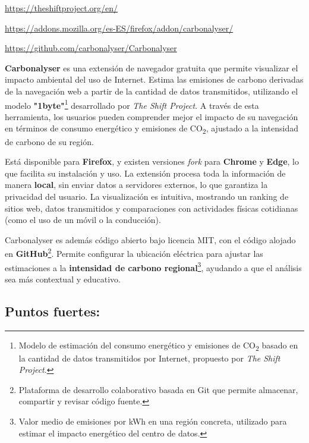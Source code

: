 \documentclass[12pt,a4paper]{report}
\begin{document}
\href{https://theshiftproject.org/en/}{https://theshiftproject.org/en/}

\href{https://addons.mozilla.org/es-ES/firefox/addon/carbonalyser/}{https://addons.mozilla.org/es-ES/firefox/addon/carbonalyser/}

\href{https://github.com/carbonalyser/Carbonalyser}{https://github.com/carbonalyser/Carbonalyser}

\textbf{Carbonalyser} es una extensión de navegador gratuita que permite visualizar el impacto ambiental del uso de Internet. Estima las emisiones de carbono derivadas de la navegación web a partir de la cantidad de datos transmitidos, utilizando el modelo \textbf{"1byte"}\footnote{Modelo de estimación del consumo energético y emisiones de CO\textsubscript{2} basado en la cantidad de datos transmitidos por Internet, propuesto por \textit{The Shift Project}.} desarrollado por \textit{The Shift Project}. A través de esta herramienta, los usuarios pueden comprender mejor el impacto de su navegación en términos de consumo energético y emisiones de CO\textsubscript{2}, ajustado a la intensidad de carbono de su región.

Está disponible para \textbf{Firefox}, y existen versiones \textit{fork} para
\textbf{Chrome} y \textbf{Edge}, lo que facilita su instalación y uso. La
extensión procesa toda la información de manera \textbf{local}, sin enviar
datos a servidores externos, lo que garantiza la privacidad del usuario. La
visualización es intuitiva, mostrando un ranking de sitios web, datos
transmitidos y comparaciones con actividades físicas cotidianas (como el uso de
un móvil o la conducción).

Carbonalyser es además código abierto bajo licencia MIT, con el código alojado
en \textbf{GitHub}\footnote{Plataforma de desarrollo colaborativo basada en Git que permite almacenar, compartir y revisar
  código fuente.}. Permite configurar la ubicación eléctrica para ajustar las
estimaciones a la \textbf{intensidad de carbono regional}\footnote{Valor medio de emisiones por kWh en una región concreta, utilizado para estimar el impacto energético del centro de datos.}, ayudando a que el análisis
sea más contextual y educativo.

\subsection*{Puntos fuertes:}
\end{document}

